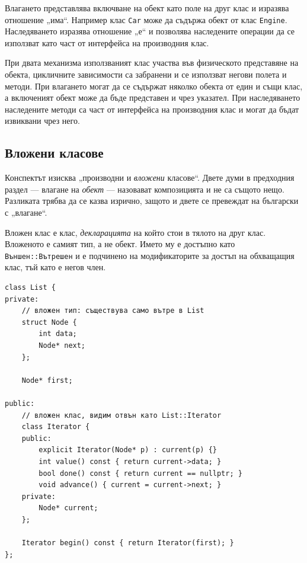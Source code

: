 \begin{defn}
Влагането представлява включване на обект като поле на друг клас и изразява отношение „има“. Например клас \texttt{Car} може да съдържа обект от клас \texttt{Engine}. Наследяването изразява отношение „е“ и позволява наследените операции да се използват като част от интерфейса на производния клас.
\end{defn}

При двата механизма използваният клас участва във физическото представяне на обекта, цикличните зависимости са забранени и се използват негови полета и методи. При влагането могат да се съдържат няколко обекта от един и същи клас, а включеният обект може да бъде представен и чрез указател. При наследяването наследените методи са част от интерфейса на производния клас и могат да бъдат извиквани чрез него.

\subsection{Вложени класове}\label{s:16.3.4}

Конспектът изисква „производни и \emph{вложени} класове“. Двете думи в
предходния раздел --- влагане на \emph{обект} --- назовават композицията и не са
същото нещо. Разликата трябва да се казва изрично, защото и двете се превеждат
на български с „влагане“.

\begin{defn}
Вложен клас е клас, \emph{декларацията} на който стои в тялото на друг клас.
Вложеното е самият тип, а не обект. Името му е достъпно като
\verb|Външен::Вътрешен| и е подчинено на модификаторите за достъп на обхващащия
клас, тъй като е негов член.
\end{defn}

\begin{verbatim}
class List {
private:
    // вложен тип: съществува само вътре в List
    struct Node {
        int data;
        Node* next;
    };

    Node* first;

public:
    // вложен клас, видим отвън като List::Iterator
    class Iterator {
    public:
        explicit Iterator(Node* p) : current(p) {}
        int value() const { return current->data; }
        bool done() const { return current == nullptr; }
        void advance() { current = current->next; }
    private:
        Node* current;
    };

    Iterator begin() const { return Iterator(first); }
};
\end{verbatim}

